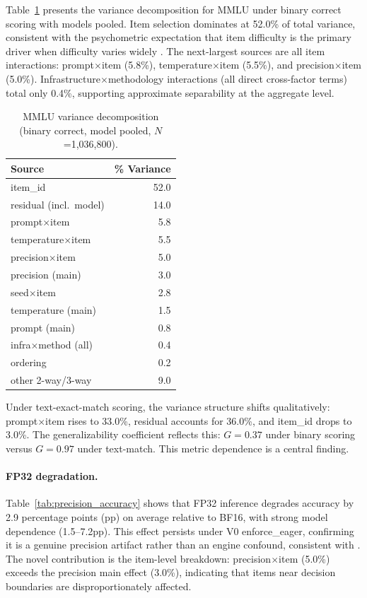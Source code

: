 \documentclass[11pt,twocolumn]{article}
\begin{document}
Table~\ref{tab:mmlu_binary} presents the variance decomposition for MMLU under binary correct scoring with models pooled. Item selection dominates at 52.0\% of total variance, consistent with the psychometric expectation that item difficulty is the primary driver when difficulty varies widely \citep{brennan2001}. The next-largest sources are all item interactions: prompt$\times$item (5.8\%), temperature$\times$item (5.5\%), and precision$\times$item (5.0\%). Infrastructure$\times$methodology interactions (all direct cross-factor terms) total only 0.4\%, supporting approximate separability at the aggregate level.

\begin{table}[t]
\centering
\caption{MMLU variance decomposition (binary correct, model pooled, $N$=1,036,800).}
\label{tab:mmlu_binary}
\small
\begin{tabular}{@{}lr@{}}
\toprule
Source & \% Variance \\
\midrule
item\_id & 52.0 \\
residual (incl.\ model) & 14.0 \\
prompt$\times$item & 5.8 \\
temperature$\times$item & 5.5 \\
precision$\times$item & 5.0 \\
precision (main) & 3.0 \\
seed$\times$item & 2.8 \\
temperature (main) & 1.5 \\
prompt (main) & 0.8 \\
infra$\times$method (all) & 0.4 \\
ordering & 0.2 \\
other 2-way/3-way & 9.0 \\
\bottomrule
\end{tabular}
\end{table}

Under text-exact-match scoring, the variance structure shifts qualitatively: prompt$\times$item rises to 33.0\%, residual accounts for 36.0\%, and item\_id drops to 3.0\%. The generalizability coefficient reflects this: $G=0.37$ under binary scoring versus $G=0.97$ under text-match. This metric dependence is a central finding.

\paragraph{FP32 degradation.} Table~\ref{tab:precision_accuracy} shows that FP32 inference degrades accuracy by 2.9 percentage points (pp) on average relative to BF16, with strong model dependence (1.5--7.2pp). This effect persists under V0 enforce\_eager, confirming it is a genuine precision artifact rather than an engine confound, consistent with \citet{yuan2025}. The novel contribution is the item-level breakdown: precision$\times$item (5.0\%) exceeds the precision main effect (3.0\%), indicating that items near decision boundaries are disproportionately affected.
\end{document}
